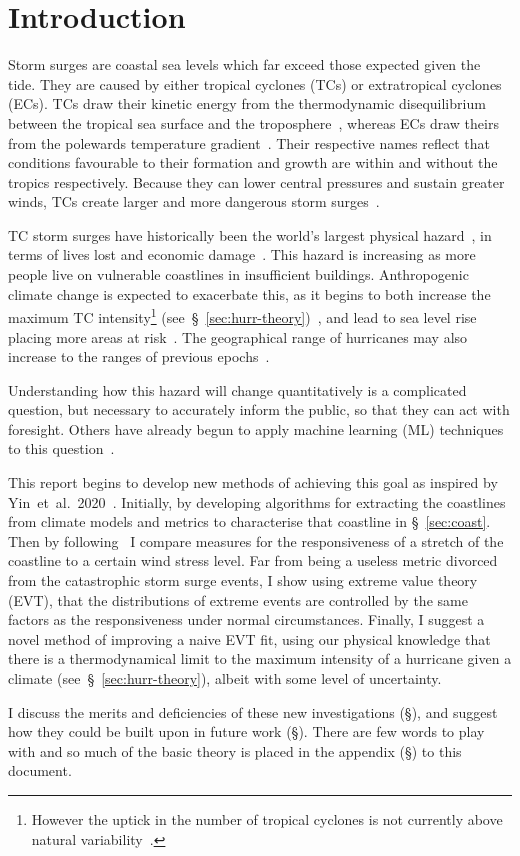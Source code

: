 \section{Introduction}
\label{sec:1_Introduction}


Storm surges are coastal sea levels which far exceed those
expected given the tide.
They are caused by either tropical cyclones
(TCs) or extratropical cyclones (ECs).
TCs draw their kinetic energy from the thermodynamic disequilibrium between
the tropical sea surface and the troposphere~\cite{emanuel1987dependence},
whereas ECs draw theirs from the
polewards temperature gradient~\cite{lorenz1960energy, holton2004introduction}.
Their respective names reflect that conditions favourable
to their formation and growth are within and without the tropics respectively.
Because they can lower central pressures and sustain greater winds,
TCs create larger and more dangerous storm surges~\cite{emanuel2005divine}.

TC storm surges have historically been the
world's largest physical hazard~\cite{shultz2005epidemiology},
in terms of lives lost and economic damage~\cite{zhang2009tropical}.
This hazard is increasing as more people live on vulnerable coastlines
in insufficient buildings.
Anthropogenic climate change is expected to exacerbate this,
as it begins to both increase the maximum TC intensity\footnote{However the uptick
in the number of tropical cyclones is not currently above
 natural variability~\cite{mendelsohn2012impact}.}
(see~§~\ref{sec:hurr-theory})~\cite{emanuel2008hurricanes},
and lead to sea level rise placing more areas at risk~\cite{SROCC}.
The geographical range of hurricanes may also increase
to the ranges of previous epochs~\cite{fedorov2010tropical}.

Understanding how this hazard will change quantitatively
is a complicated question, but necessary to accurately
inform the public,
so that they can act with foresight.
Others have already begun to apply machine learning (ML) techniques to this
question~\cite{kulp2019new, kulp2018coastaldem}.

This report begins to develop new methods of achieving this goal
as inspired by Yin~et~al.~2020~\cite{ZannaPreprint}. Initially, by
developing algorithms for extracting the coastlines from climate models
and metrics to characterise that coastline in §~\ref{sec:coast}.
Then by following~\cite{ZannaPreprint} I compare measures for the
responsiveness of a stretch of the coastline to a certain wind stress
level. Far from being a useless metric divorced from the catastrophic
storm surge events, I show using extreme value theory (EVT), that the
distributions of extreme events are controlled by the same factors as
the responsiveness under normal circumstances. Finally, I suggest a
novel method of improving a naive EVT fit, using our physical knowledge
that there is a thermodynamical limit to the maximum intensity of a hurricane
 given a climate (see~§~\ref{sec:hurr-theory}), albeit with some level of
 uncertainty.


I discuss the merits and deficiencies of these new investigations (§),
and suggest how they could be built upon in future work (§).
 There are few words to play with
and so much of the basic theory is placed in the appendix (§) to this document.
